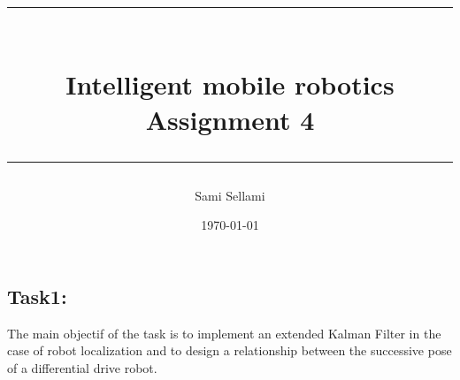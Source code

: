 \documentclass[11pt,a4paper]{report}
\title{
\rule{15cm}{1pt} \\
\Large {\bfseries Intelligent mobile robotics} \\
\Large {\bfseries Assignment 4}\\
\rule{15cm}{1pt}}
\author{Sami Sellami}
\date{\today}
\begin{document}
\setcounter{page}{1}
\setcounter{secnumdepth}{1}
	
\selectfont

\maketitle

\titlelabel{\thetitle)\quad}
\titlespacing{\chapter}{0cm}{0cm}{0cm}
\titlespacing{\section}{0.2cm}{0cm}{0cm}

\subsection{\textbf{Task1:}} 
The main objectif of the task is to implement an extended Kalman Filter in the case of robot localization and to design a relationship between the successive pose of a differential drive robot.\\
\end{document}
